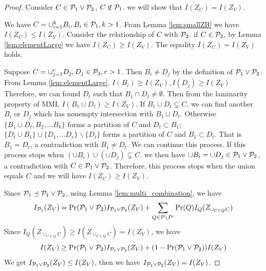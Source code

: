\documentclass{article}
\begin{document}
\begin{proof}
	
Consider $C \in \P_1 \vee \P_2$, $C\not\in \P_1$. we will show that $I(Z_C) = I(Z_V)$.

We have $C = \cup_{i=1}^k B_i ,B_i\in \P_1, k>1$. 
From Lemma \ref{lem:smallZB} we have $I(Z_C) \leq I(Z_V)$.
Consider the relationship of $C$ with $\P_2$. if $C\in \P_2$, by Lemma \ref{lem:elementLarge} we have
$I(Z_C) \geq I(Z_V)$. The equality $I(Z_C) = I(Z_V)$ holds.

Suppose  $C = \cup_{j=1}^r D_j ,D_j\in \P_2, r>1$. Then $B_i \neq D_j$ by the definition of $\P_1\vee \P_2$. From Lemma \ref{lem:elementLarge}, $I(B_i)\geq I(Z_V), I(D_j) \geq I(Z_V)$
Therefore, we can found $D_t$ such that $B_1 \cap D_t\neq\emptyset$. Then from the laminarity property of MMI, $I(B_1 \cup D_t)\geq I(Z_V)$. If $B_1 \cup D_t \subsetneq C$, we can find another $B_i$ or $D_j$ which has nonempty intersection with  $B_1 \cup D_t$. Otherwise $\{B_1 \cup D_t, B_2, \dots B_k\}$
forms a partition of $C$ and $D_t \subset B_1$; $\{D_t \cup B_1\}\cup \{ D_1, \dots D_r\}\backslash \{D_t\}$
forms a partition of $C$ and $B_1 \subset D_t$. That is $B_1 = D_t$, a contradiction with $B_1 \neq D_t$. 
We can continue this process. If this process stops when $(\cup B_i)\cup(\cup D_j) \subsetneq C$. we then have $\cup B_i = \cup D_j \in \P_1 \vee \P_2$, a contradiction with $C \in \P_1 \vee \P_2$. 
Therefore, this process stops when the union equals $C$ and we will have $I(Z_C) \geq I(Z_V)$.

Since $\P_1 \preceq \P_1 \vee \P_2 $, using Lemma \ref{lem:multi_combination}, we have
\begin{equation*}
I_{\P_1}(Z_V) = \Pr(\P_1 \vee \P_2) I_{\P_1 \vee \P_2}(Z_V) + \sum_{Q \in \P\backslash\P'} \Pr(Q) I_{Q}(Z_{\cup_{C\in Q}C})
\end{equation*}
Since $I_{Q}(Z_{\cup_{C\in Q}C})\geq I(Z_{\cup_{C\in Q}C}) = I(Z_V)$, we have
\begin{equation*}
I(Z_V) \geq \Pr(\P_1 \vee \P_2) I_{\P_1 \vee \P_2}(Z_V) + (1-\Pr(\P_1 \vee \P_2)) I(Z_V)	
\end{equation*}
We get $I_{\P_1 \vee \P_2}(Z_V) \leq I(Z_V)$, then we have $I_{\P_1 \vee \P_2}(Z_V) =  I(Z_V)$.


\end{proof}
\end{document}

